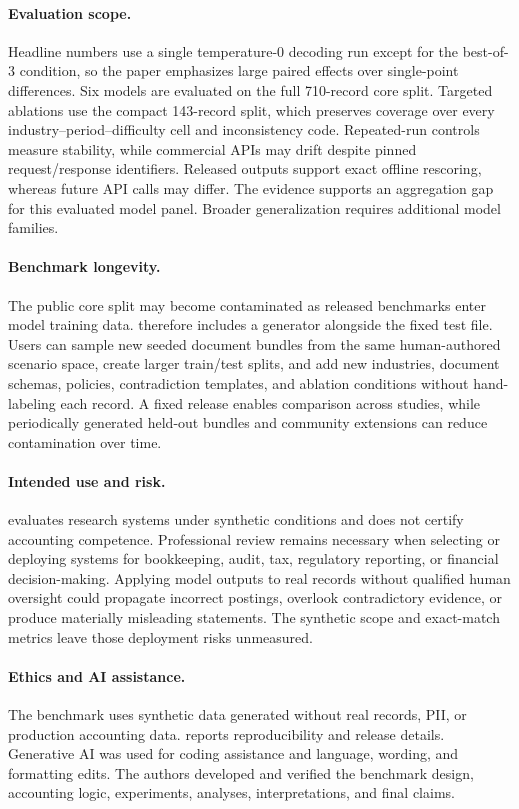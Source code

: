 \paragraph{Evaluation scope.}
Headline numbers use a single temperature-$0$ decoding run except for the best-of-3 condition, so the paper emphasizes large paired effects over single-point differences. Six models are evaluated on the full 710-record core split. Targeted ablations use the compact 143-record split, which preserves coverage over every industry--period--difficulty cell and inconsistency code. Repeated-run controls measure stability, while commercial APIs may drift despite pinned request/response identifiers. Released outputs support exact offline rescoring, whereas future API calls may differ. The evidence supports an aggregation gap for this evaluated model panel. Broader generalization requires additional model families.

\paragraph{Benchmark longevity.}
The public core split may become contaminated as released benchmarks enter model training data. \benchmark{} therefore includes a generator alongside the fixed test file. Users can sample new seeded document bundles from the same human-authored scenario space, create larger train/test splits, and add new industries, document schemas, policies, contradiction templates, and ablation conditions without hand-labeling each record. A fixed release enables comparison across studies, while periodically generated held-out bundles and community extensions can reduce contamination over time.

\paragraph{Intended use and risk.}
\benchmark{} evaluates research systems under synthetic conditions and does not certify accounting competence. Professional review remains necessary when selecting or deploying systems for bookkeeping, audit, tax, regulatory reporting, or financial decision-making. Applying model outputs to real records without qualified human oversight could propagate incorrect postings, overlook contradictory evidence, or produce materially misleading statements. The synthetic scope and exact-match metrics leave those deployment risks unmeasured.

\paragraph{Ethics and AI assistance.}
The benchmark uses synthetic data generated without real records, PII, or production accounting data.  reports reproducibility and release details. Generative AI was used for coding assistance and language, wording, and formatting edits. The authors developed and verified the benchmark design, accounting logic, experiments, analyses, interpretations, and final claims.
